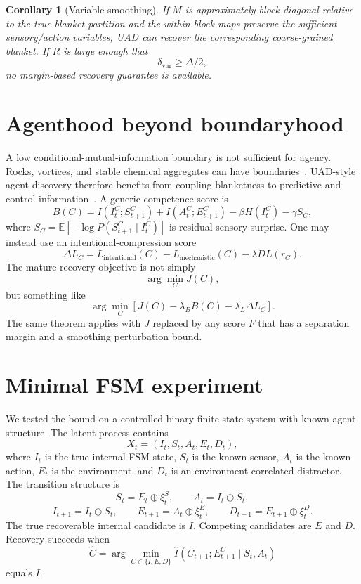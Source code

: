 \documentclass[10pt]{article}
\newtheorem{corollary}{Corollary}
\newcommand{\MI}{I}
\newcommand{\E}{\mathbb{E}}
\begin{document}
\begin{corollary}[Variable smoothing]
If \(M\) is approximately block-diagonal relative to the true blanket partition and the within-block maps preserve the sufficient sensory/action variables, UAD can recover the corresponding coarse-grained blanket. If \(R\) is large enough that
\[
\delta_{\mathrm{var}}\ge \Delta/2,
\]
no margin-based recovery guarantee is available.
\end{corollary}

\section{Agenthood beyond boundaryhood}

A low conditional-mutual-information boundary is not sufficient for agency. Rocks, vortices, and stable chemical aggregates can have boundaries~\cite{kirchhoff2018markov}. UAD-style agent discovery therefore benefits from coupling blanketness to predictive and control information~\cite{biq2025}. A generic competence score is
\[
B(C)
=
\MI(I_t^C;S^C_{t+1})
+
\MI(A_t^C;E^C_{t+1})
-
\beta H(I_t^C)
-
\gamma S_C,
\]
where \(S_C=\E[-\log P(S^C_{t+1}\mid I^C_t)]\) is residual sensory surprise. One may instead use an intentional-compression score~\cite{eis2025}
\[
\Delta L_C
=
L_{\mathrm{intentional}}(C)
-
L_{\mathrm{mechanistic}}(C)
-
\lambda DL(r_C).
\]
The mature recovery objective is not simply
\[
\arg\min_C J(C),
\]
but something like
\[
\arg\min_C
\left[
J(C)-\lambda_B B(C)-\lambda_L\Delta L_C
\right].
\]
The same theorem applies with \(J\) replaced by any score \(F\) that has a separation margin and a smoothing perturbation bound.

\section{Minimal FSM experiment}

We tested the bound on a controlled binary finite-state system with known agent structure. The latent process contains
\[
X_t=(I_t,S_t,A_t,E_t,D_t),
\]
where \(I_t\) is the true internal FSM state, \(S_t\) is the known sensor, \(A_t\) is the known action, \(E_t\) is the environment, and \(D_t\) is an environment-correlated distractor. The transition structure is
\[
S_t=E_t\oplus \xi^S_t,
\qquad
A_t=I_t\oplus S_t,
\]
\[
I_{t+1}=I_t\oplus S_t,
\qquad
E_{t+1}=A_t\oplus \xi^E_t,
\qquad
D_{t+1}=E_{t+1}\oplus \xi^D_t.
\]
The true recoverable internal candidate is \(I\). Competing candidates are \(E\) and \(D\). Recovery succeeds when
\[
\hat C
=
\arg\min_{C\in\{I,E,D\}}
\hat \MI(C_{t+1};E^C_{t+1}\mid S_t,A_t)
\]
equals \(I\).
\end{document}
